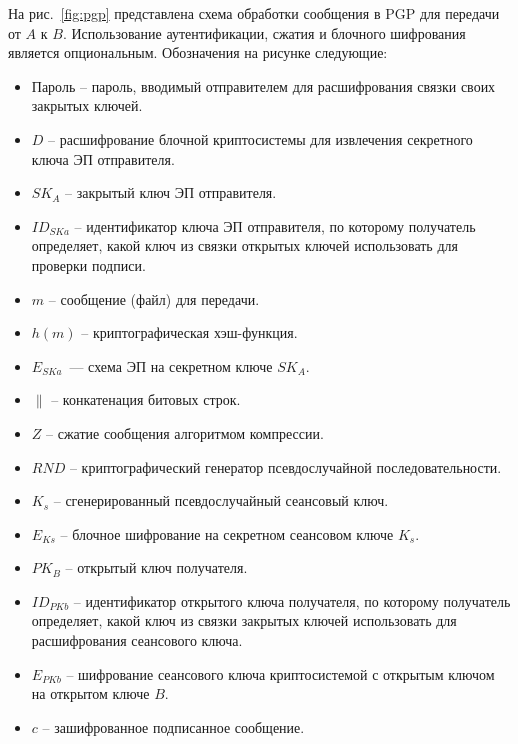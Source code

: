 На рис.~\ref{fig:pgp} представлена схема обработки сообщения в PGP для передачи от $A$ к $B$. Использование аутентификации, сжатия и блочного шифрования является опциональным. Обозначения на рисунке следующие:
\begin{itemize}
    \item Пароль -- пароль, вводимый отправителем для расшифрования связки своих закрытых ключей.
    \item $D$ -- расшифрование блочной криптосистемы для извлечения секретного ключа ЭП отправителя.
    \item $SK_A$ -- закрытый ключ ЭП отправителя.
    \item $ID_{SKa}$ -- идентификатор ключа ЭП отправителя, по которому получатель определяет, какой ключ из связки открытых ключей использовать для проверки подписи.
    \item $m$ -- сообщение (файл) для передачи.
    \item $h(m)$ -- криптографическая хэш-функция.
    \item $E_{SKa}$~--- схема ЭП на секретном ключе $SK_A$.
    \item $\|$ -- конкатенация битовых строк.
    \item $Z$ -- сжатие сообщения алгоритмом компрессии.
    \item $RND$ -- криптографический генератор псевдослучайной последовательности.
    \item $K_s$ -- сгенерированный псевдослучайный сеансовый ключ.
    \item $E_{Ks}$ -- блочное шифрование на секретном сеансовом ключе $K_s$.
    \item $PK_B$ -- открытый ключ получателя.
    \item $ID_{PKb}$ -- идентификатор открытого ключа получателя, по которому получатель определяет, какой ключ из связки закрытых ключей использовать для расшифрования сеансового ключа.
    \item $E_{PKb}$ -- шифрование сеансового ключа криптосистемой с открытым ключом на открытом ключе $B$.
    \item $c$ -- зашифрованное подписанное сообщение.
\end{itemize}
